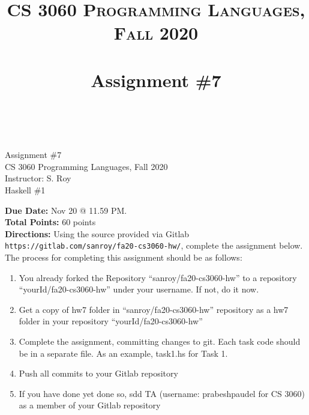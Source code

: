 \documentclass[paper=letter, fontsize=11pt]{scrartcl} %
\title{ 
    \normalfont \normalsize 
    \textsc{CS 3060 Programming Languages, Fall 2020} \\ [25pt] %
    \horrule{0.5pt} \\[0.4cm] %
    \huge Assignment \#7  \\ %
    \horrule{2pt} \\[0.5cm] %
}
\begin{document}
    \begin{center}
         Assignment \#7\\
        \small CS 3060 Programming Languages, Fall 2020 \\
        \small Instructor: S. Roy \\
        \huge Haskell \#1
    \end{center}
    
    \textbf{Due Date:} Nov 20 @ 11.59 PM. \\
    \textbf{Total Points:} 60 points \\

    \textbf{Directions:} Using the source provided via Gitlab \@ \texttt{https://gitlab.com/sanroy/fa20-cs3060-hw/},
complete the assignment below. The process for completing this assignment should be as follows:

    \begin{enumerate}[noitemsep]
        \item You already forked the Repository ``sanroy/fa20-cs3060-hw'' to a repository ``yourId/fa20-cs3060-hw'' under your username. If not, do it now.
        \item Get a copy of hw7 folder in ``sanroy/fa20-cs3060-hw'' repository as a hw7 folder in your repository ``yourId/fa20-cs3060-hw''
        \item Complete the assignment, committing changes to git. Each task code should be in a separate file. As an example, task1.hs for Task 1.
        \item Push all commits to your Gitlab repository
        \item If you have done yet done so, sdd TA (username: prabeshpaudel for CS 3060) as a member of your Gitlab repository
    \end{enumerate}
\end{document}
